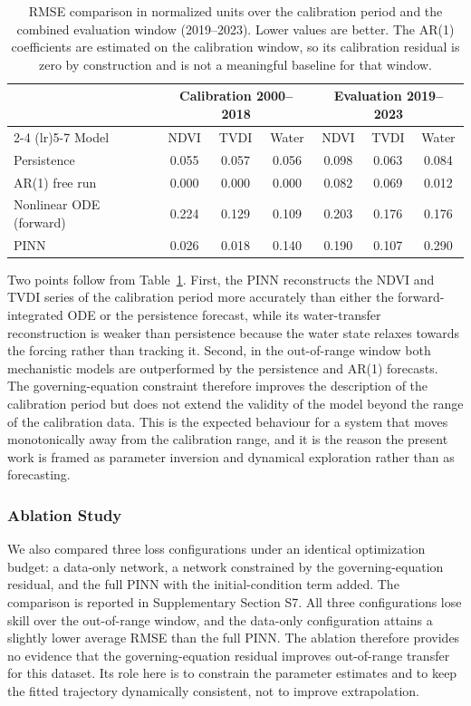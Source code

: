 \documentclass[preprint,review,12pt,3p]{elsarticle}
\begin{document}
\begin{table}[H]
	\centering
	\caption{RMSE comparison in normalized units over the calibration period and the combined evaluation window (2019--2023). Lower values are better. The AR(1) coefficients are estimated on the calibration window, so its calibration residual is zero by construction and is not a meaningful baseline for that window.}
	\label{tab:baseline}
	\small
	\begin{tabular}{lcccccc}
		\toprule
		& \multicolumn{3}{c}{Calibration 2000--2018} & \multicolumn{3}{c}{Evaluation 2019--2023} \\
		\cmidrule(lr){2-4} \cmidrule(lr){5-7}
		Model & NDVI & TVDI & Water & NDVI & TVDI & Water \\
		\midrule
		Persistence & 0.055 & 0.057 & 0.056 & 0.098 & 0.063 & 0.084 \\
		AR(1) free run & 0.000 & 0.000 & 0.000 & 0.082 & 0.069 & 0.012 \\
		Nonlinear ODE (forward) & 0.224 & 0.129 & 0.109 & 0.203 & 0.176 & 0.176 \\
		PINN & 0.026 & 0.018 & 0.140 & 0.190 & 0.107 & 0.290 \\
		\bottomrule
	\end{tabular}
\end{table}

Two points follow from Table~\ref{tab:baseline}. First, the PINN reconstructs the NDVI and TVDI series of the calibration period more accurately than either the forward-integrated ODE or the persistence forecast, while its water-transfer reconstruction is weaker than persistence because the water state relaxes towards the forcing rather than tracking it. Second, in the out-of-range window both mechanistic models are outperformed by the persistence and AR(1) forecasts. The governing-equation constraint therefore improves the description of the calibration period but does not extend the validity of the model beyond the range of the calibration data. This is the expected behaviour for a system that moves monotonically away from the calibration range, and it is the reason the present work is framed as parameter inversion and dynamical exploration rather than as forecasting.

\subsubsection{Ablation Study}

We also compared three loss configurations under an identical optimization budget: a data-only network, a network constrained by the governing-equation residual, and the full PINN with the initial-condition term added. The comparison is reported in Supplementary Section S7. All three configurations lose skill over the out-of-range window, and the data-only configuration attains a slightly lower average RMSE than the full PINN. The ablation therefore provides no evidence that the governing-equation residual improves out-of-range transfer for this dataset. Its role here is to constrain the parameter estimates and to keep the fitted trajectory dynamically consistent, not to improve extrapolation.
\end{document}
